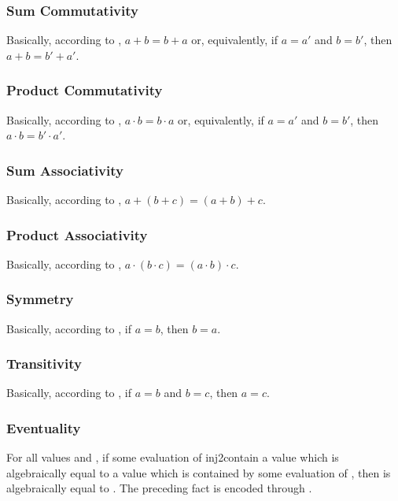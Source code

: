 \documentclass{report}
\begin{document}
\subsubsection{Sum Commutativity}
Basically, according to , \(a + b = b + a\) or, equivalently, if \(a = a\prime\) and \(b = b\prime\), then \(a + b = b\prime + a\prime\).

\subsubsection{Product Commutativity}
Basically, according to , \(a \cdot b = b \cdot a\) or, equivalently, if \(a = a\prime\) and \(b = b\prime\), then \(a \cdot b = b\prime \cdot a\prime\).

\subsubsection{Sum Associativity}
Basically, according to , \(a + \left(b + c\right) = \left(a + b\right) + c\).

\subsubsection{Product Associativity}
Basically, according to , \(a \cdot \left(b \cdot c\right) = \left(a \cdot b\right) \cdot c\).

\subsubsection{Symmetry}
Basically, according to , if \(a = b\), then \(b = a\).

\subsubsection{Transitivity}
Basically, according to , if \(a = b\) and \(b = c\), then \(a = c\).

\subsubsection{Eventuality}
For all  values  and , if some evaluation of  \gls{inj2contain} a value which is algebraically equal to a value which is contained by some evaluation of , then  is algebraically equal to .  The preceding fact is encoded through .
\end{document}
